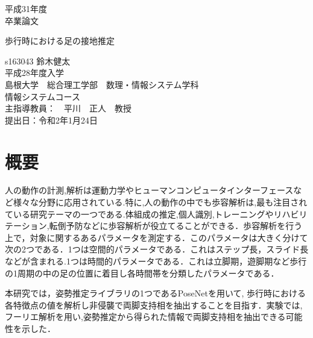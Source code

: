 \documentclass[a4j,10.5pt]{jreport}
\begin{document}
\begin{titlepage}

\vspace{40mm}
\begin{center}
{\Large 平成31年度\\卒業論文}\\[80mm]
\end{center}

\begin{center}
{\huge 歩行時における足の接地推定}\\[80mm]
\end{center}

\begin{flushright}
{\large s163043 鈴木健太}\\[1mm]
{\large 平成28年度入学}\\[1mm]
{\large 島根大学　総合理工学部　数理・情報システム学科}\\[1mm]
{\large 情報システムコース}\\[8mm]
{\large 主指導教員：　平川　正人　教授}\\[3mm]
{\large 提出日：令和2年1月24日}\\%
\end{flushright}
\end{titlepage}

\newpage

\chapter*{概要}
人の動作の計測,解析は運動力学やヒューマンコンピュータインターフェースなど様々な分野に応用されている.特に,人の動作の中でも歩容解析は,最も注目されている研究テーマの一つである.体組成の推定\cite{cite1},個人識別,トレーニングやリハビリテーション,転倒予防などに歩容解析が役立てることができる．歩容解析を行う上で，対象に関するあるパラメータを測定する．このパラメータは大きく分けて次の2つである．1つは空間的パラメータである．これはステップ長，スライド長などが含まれる.1つは時間的パラメータである．これは立脚期，遊脚期\cite{cite2}など歩行の1周期の中の足の位置に着目し各時間帯を分類したパラメータである．

本研究では，姿勢推定ライブラリの1つであるPoseNetを用いて,
歩行時における各特徴点の値を解析し非侵襲で両脚支持相を抽出することを目指す．実験では,フーリエ解析を用い,姿勢推定から得られた情報で両脚支持相を抽出できる可能性を示した．
\end{document}
